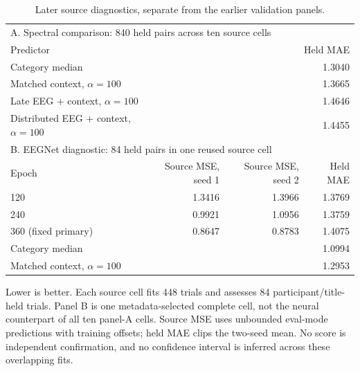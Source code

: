 \begin{table}[tbp]
\centering\small
\caption{Later source diagnostics, separate from the earlier validation panels.}
\label{tab:sourcefollowup}
\begin{tabular}{lrrr}
\toprule
\multicolumn{4}{l}{A. Spectral comparison: 840 held pairs across ten source cells}\\
Predictor & \multicolumn{3}{r}{Held MAE}\\
\midrule
Category median & \multicolumn{3}{r}{1.3040}\\
Matched context, $\alpha=100$ & \multicolumn{3}{r}{1.3665}\\
Late EEG + context, $\alpha=100$ & \multicolumn{3}{r}{1.4646}\\
Distributed EEG + context, $\alpha=100$ & \multicolumn{3}{r}{1.4455}\\
\midrule
\multicolumn{4}{l}{B. EEGNet diagnostic: 84 held pairs in one reused source cell}\\
Epoch & Source MSE, seed 1 & Source MSE, seed 2 & Held MAE\\
\midrule
120 & 1.3416 & 1.3966 & 1.3769\\
240 & 0.9921 & 1.0956 & 1.3759\\
360 (fixed primary) & 0.8647 & 0.8783 & 1.4075\\
\midrule
Category median & \multicolumn{3}{r}{1.0994}\\
Matched context, $\alpha=100$ & \multicolumn{3}{r}{1.2953}\\
\bottomrule
\end{tabular}
\par\medskip\begin{minipage}{0.97\linewidth}\footnotesize Lower is better. Each source cell fits 448 trials and assesses 84 participant/title-held trials. Panel B is one metadata-selected complete cell, not the neural counterpart of all ten panel-A cells. Source MSE uses unbounded eval-mode predictions with training offsets; held MAE clips the two-seed mean. No score is independent confirmation, and no confidence interval is inferred across these overlapping fits.\end{minipage}
\end{table}

